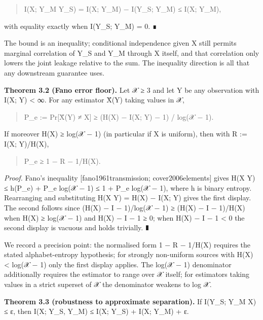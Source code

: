 \documentclass[
  11pt,
]{article}
\begin{document}
\begin{quote}
I(X; Y\_M \textbar{} Y\_S) = I(X; Y\_M) − I(Y\_S; Y\_M) ≤ I(X; Y\_M),
\end{quote}

with equality exactly when I(Y\_S; Y\_M) = 0. ∎

The bound is an inequality; conditional independence given X still
permits marginal correlation of Y\_S and Y\_M through X itself, and that
correlation only lowers the joint leakage relative to the sum. The
inequality direction is all that any downstream guarantee uses.

\textbf{Theorem 3.2 (Fano error floor).} Let \textbar 𝒳\textbar{} ≥ 3
and let Y be any observation with I(X; Y) \textless{} ∞. For any
estimator X̂(Y) taking values in 𝒳,

\begin{quote}
P\_e := Pr{[}X̂(Y) ≠ X{]} ≥ (H(X) − I(X; Y) − 1) /
log(\textbar 𝒳\textbar{} − 1).
\end{quote}

If moreover H(X) ≥ log(\textbar 𝒳\textbar{} − 1) (in particular if X is
uniform), then with R := I(X; Y)/H(X),

\begin{quote}
P\_e ≥ 1 − R − 1/H(X).
\end{quote}

\emph{Proof.} Fano's inequality {[}fano1961transmission;
cover2006elements{]} gives H(X \textbar{} Y) ≤ h(P\_e) + P\_e
log(\textbar 𝒳\textbar{} − 1) ≤ 1 + P\_e log(\textbar 𝒳\textbar{} − 1),
where h is binary entropy. Rearranging and substituting H(X \textbar{}
Y) = H(X) − I(X; Y) gives the first display. The second follows since
(H(X) − I − 1)/log(\textbar 𝒳\textbar{} − 1) ≥ (H(X) − I − 1)/H(X) when
H(X) ≥ log(\textbar 𝒳\textbar{} − 1) and H(X) − I − 1 ≥ 0; when H(X) − I
− 1 \textless{} 0 the second display is vacuous and holds trivially. ∎

We record a precision point: the normalised form 1 − R − 1/H(X) requires
the stated alphabet-entropy hypothesis; for strongly non-uniform sources
with H(X) \textless{} log(\textbar 𝒳\textbar{} − 1) only the first
display applies. The log(\textbar 𝒳\textbar{} − 1) denominator
additionally requires the estimator to range over 𝒳 itself; for
estimators taking values in a strict superset of 𝒳 the denominator
weakens to log \textbar 𝒳\textbar.

\textbf{Theorem 3.3 (robustness to approximate separation).} If I(Y\_S;
Y\_M \textbar{} X) ≤ ε, then I(X; Y\_S, Y\_M) ≤ I(X; Y\_S) + I(X; Y\_M)
+ ε.
\end{document}
